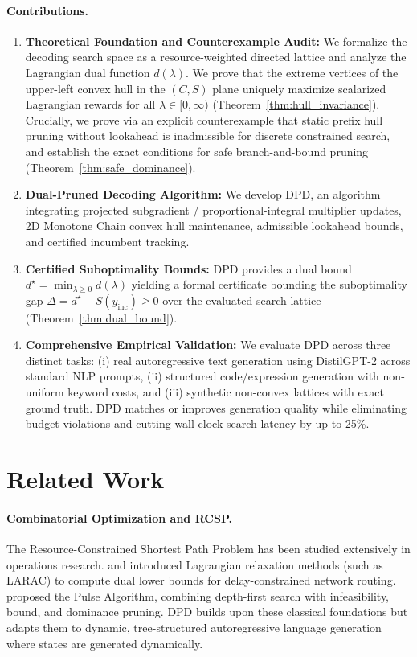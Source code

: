 \documentclass[11pt,a4paper]{article}
\theoremstyle{plain}
\theoremstyle{definition}
\theoremstyle{remark}
\begin{document}
\paragraph{Contributions.}
\begin{enumerate}
    \item \textbf{Theoretical Foundation and Counterexample Audit:} We formalize the decoding search space as a resource-weighted directed lattice and analyze the Lagrangian dual function $d(\lambda)$. We prove that the extreme vertices of the upper-left convex hull in the $(C, S)$ plane uniquely maximize scalarized Lagrangian rewards for all $\lambda \in [0, \infty)$ (Theorem~\ref{thm:hull_invariance}). Crucially, we prove via an explicit counterexample that static prefix hull pruning without lookahead is inadmissible for discrete constrained search, and establish the exact conditions for safe branch-and-bound pruning (Theorem~\ref{thm:safe_dominance}).
    \item \textbf{Dual-Pruned Decoding Algorithm:} We develop DPD, an algorithm integrating projected subgradient / proportional-integral multiplier updates, 2D Monotone Chain convex hull maintenance, admissible lookahead bounds, and certified incumbent tracking.
    \item \textbf{Certified Suboptimality Bounds:} DPD provides a dual bound $d^\star = \min_{\lambda \ge 0} d(\lambda)$ yielding a formal certificate bounding the suboptimality gap $\Delta = d^\star - S(y_{\text{inc}}) \ge 0$ over the evaluated search lattice (Theorem~\ref{thm:dual_bound}).
    \item \textbf{Comprehensive Empirical Validation:} We evaluate DPD across three distinct tasks: (i) real autoregressive text generation using DistilGPT-2 across standard NLP prompts, (ii) structured code/expression generation with non-uniform keyword costs, and (iii) synthetic non-convex lattices with exact ground truth. DPD matches or improves generation quality while eliminating budget violations and cutting wall-clock search latency by up to 25\%.
\end{enumerate}

\section{Related Work}
\paragraph{Combinatorial Optimization and RCSP.}
The Resource-Constrained Shortest Path Problem has been studied extensively in operations research. \citet{handler1980dual} and \citet{juttner2001lagrange} introduced Lagrangian relaxation methods (such as LARAC) to compute dual lower bounds for delay-constrained network routing. \citet{lozano2013exact} proposed the Pulse Algorithm, combining depth-first search with infeasibility, bound, and dominance pruning. DPD builds upon these classical foundations but adapts them to dynamic, tree-structured autoregressive language generation where states are generated dynamically.
\end{document}

